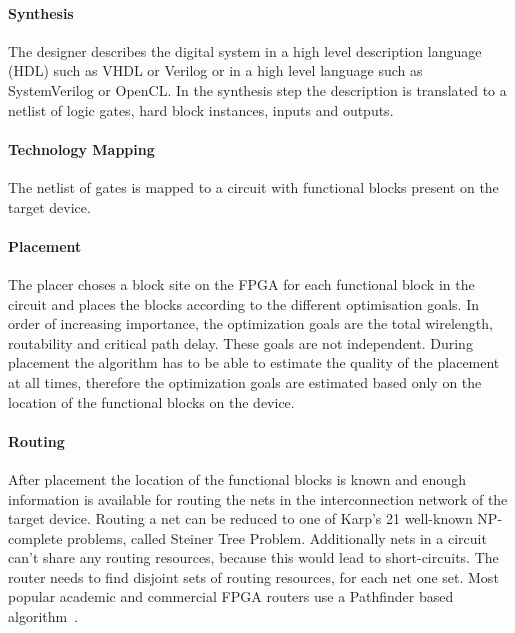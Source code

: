 \documentclass[a4paper,oneside,12pt]{article}
\begin{document}
\paragraph{Synthesis}
The designer describes the digital system in a high level description language (HDL) such as VHDL or Verilog or in a high level language such as SystemVerilog or OpenCL. In the synthesis step the description is translated to a netlist of logic gates, hard block instances, inputs and outputs.

\paragraph{Technology Mapping} 
The netlist of gates is mapped to a circuit with functional blocks present on the target device.

\paragraph{Placement}
The placer choses a block site on the FPGA for each functional block in the circuit and places the blocks according to the different optimisation goals. In order of increasing importance, the optimization goals are the total wirelength, routability and critical path delay. These goals are not independent. During placement the algorithm has to be able to estimate the quality of the placement at all times, therefore the optimization goals are estimated based only on the location of the functional blocks on the device. 

\paragraph{Routing} After placement the location of the functional blocks is known and enough information is available for routing the nets in the interconnection network of the target device. Routing a net can be reduced to  one of Karp's 21 well-known NP-complete problems, called Steiner Tree Problem. Additionally nets in a circuit can't share any routing resources, because this would lead to short-circuits. The router needs to find disjoint sets of routing resources, for each net one set. Most popular academic and commercial FPGA routers use a Pathfinder based algorithm~\cite{pathfinder, vprBVRJ, vprboek}.
\end{document}
